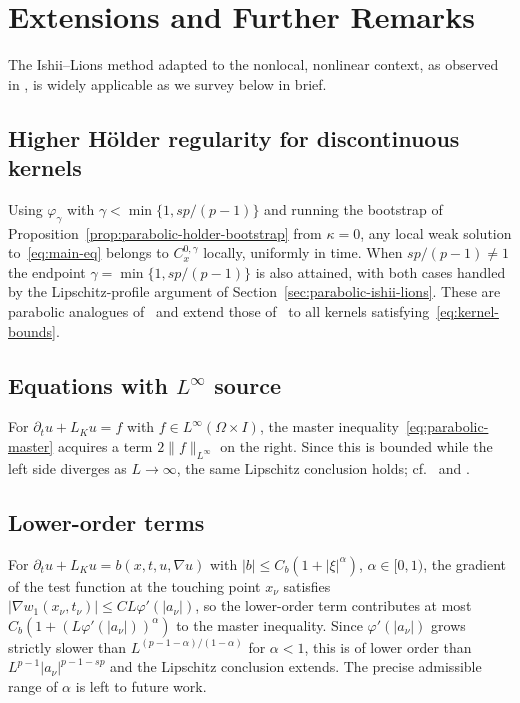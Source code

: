 \documentclass[11pt, a4paper, twoside]{article}
\theoremstyle{definition}
\theoremstyle{remark}
\begin{document}
\section{Extensions and Further Remarks}
\label{sec:extensions}
The Ishii--Lions method adapted to the nonlocal, nonlinear context, as observed in \cite{BiswasTopp2025}, is widely applicable as we survey below in brief. 

\subsection*{Higher H\"{o}lder regularity for
discontinuous kernels}
Using $\varphi_\gamma$ with $\gamma < \min\{1,sp/(p-1)\}$
and running the bootstrap of
Proposition~\ref{prop:parabolic-holder-bootstrap} from
$\kappa = 0$, any local weak solution
to~\eqref{eq:main-eq} belongs to $C^{0,\gamma}_x$
locally, uniformly in time. When $sp/(p-1) \ne 1$ the
endpoint $\gamma = \min\{1, sp/(p-1)\}$ is also attained,
with both cases handled by the Lipschitz-profile argument
of Section~\ref{sec:parabolic-ishii-lions}. These are
parabolic analogues of~\cite[Theorem~2.1]{BiswasTopp2025}
and extend those
of~\cite{BrascoLindgrenStromqvist2021,
GarainLindgrenTavakoli2025} to all kernels
satisfying~\eqref{eq:kernel-bounds}.

\subsection*{Equations with $L^\infty$ source}
For $\partial_t u + L_K u = f$ with
$f \in L^\infty(\Omega \times I)$, the master
inequality~\eqref{eq:parabolic-master} acquires a term
$2\|f\|_{L^\infty}$ on the right. Since this is bounded
while the left side diverges as $L \to \infty$, the same
Lipschitz conclusion holds;
cf.~\cite[Theorem~1.1]{BiswasTopp2025} and
\cite{Tavakoli2024Perturbative}.

\subsection*{Lower-order terms}
For $\partial_t u + L_K u = b(x,t,u,\nabla u)$ with
$|b| \le C_b(1+|\xi|^\alpha)$, $\alpha \in [0,1)$, the
gradient of the test function at the touching point
$x_\nu$ satisfies
$|\nabla w_1(x_\nu,t_\nu)| \le CL\varphi'(|a_\nu|)$,
so the lower-order term contributes at most
$C_b(1 + (L\varphi'(|a_\nu|))^\alpha)$ to the master
inequality. Since $\varphi'(|a_\nu|)$ grows strictly
slower than $L^{(p-1-\alpha)/(1-\alpha)}$ for $\alpha < 1$,
this is of lower order than
$L^{p-1}|a_\nu|^{p-1-sp}$ and the Lipschitz conclusion
extends. The precise admissible range of $\alpha$ is left
to future work.
\end{document}
